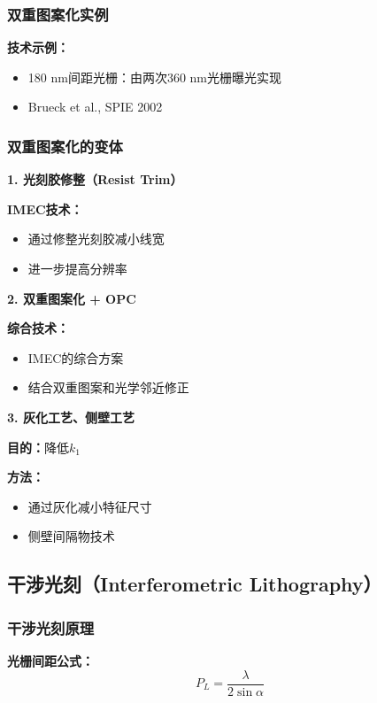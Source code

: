 \documentclass[UTF8,12pt,a4paper]{ctexart}
\begin{document}
\subsubsection{双重图案化实例}

\textbf{技术示例：}
\begin{itemize}
    \item 180 nm间距光栅：由两次360 nm光栅曝光实现
    \item Brueck et al., SPIE 2002
\end{itemize}

\subsubsection{双重图案化的变体}

\textbf{1. 光刻胶修整（Resist Trim）}

\textbf{IMEC技术：}
\begin{itemize}
    \item 通过修整光刻胶减小线宽
    \item 进一步提高分辨率
\end{itemize}

\textbf{2. 双重图案化 + OPC}

\textbf{综合技术：}
\begin{itemize}
    \item IMEC的综合方案
    \item 结合双重图案和光学邻近修正
\end{itemize}

\textbf{3. 灰化工艺、侧壁工艺}

\textbf{目的：}降低$k_1$

\textbf{方法：}
\begin{itemize}
    \item 通过灰化减小特征尺寸
    \item 侧壁间隔物技术
\end{itemize}

\subsection{干涉光刻（Interferometric Lithography）}

\subsubsection{干涉光刻原理}

\textbf{光栅间距公式：}
\begin{equation}
P_L = \frac{\lambda}{2\sin\alpha}
\end{equation}
\end{document}
